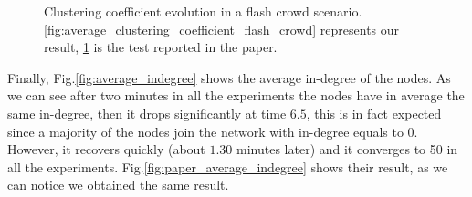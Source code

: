 \begin{figure}
\begin{subfigure}{.5\textwidth}
  \caption{}
  \label{fig:paper_average_clustering_coefficient_flash_crowd}
\end{subfigure}
\caption{Clustering coefficient evolution in a flash crowd scenario. \ref{fig:average_clustering_coefficient_flash_crowd} represents our result, \ref{fig:paper_average_clustering_coefficient_flash_crowd} is the test reported in the paper.}
\label{fig:robustness_cc_flash_crowd}
\end{figure}

Finally, Fig.\ref{fig:average_indegree} shows the average in-degree of the nodes. As we can see after two minutes in all the experiments the nodes have in average the same in-degree, then it drops significantly at time $6.5$, this is in fact expected since a majority of the nodes join the network with in-degree equals to 0. However, it recovers quickly (about $1.30$ minutes later) and it converges to 50 in all the experiments. Fig.\ref{fig:paper_average_indegree} shows their result, as we can notice we obtained the same result.

